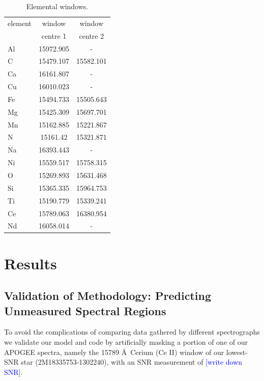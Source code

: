 \documentclass[a4paper,fleqn,usenatbib]{mnras}
\begin{document}
\begin{table}
    \centering
    \caption{Elemental windows.}
    \label{tab:window_centres}
    \begin{tabular}{lcc}
        \hline
        element & window & window \\
         & centre 1 & centre 2 \\
        \hline
        Al & 15972.905 & - \\
        C & 15479.107 & 15582.101 \\
        Ca & 16161.807 & - \\
        Cu & 16010.023 & - \\
        Fe & 15494.733 & 15505.643 \\
        Mg & 15425.309 & 15697.701 \\
        Mn & 15162.885 & 15221.867 \\
        N & 15161.42 & 15321.871 \\
        Na & 16393.443 & - \\
        Ni & 15559.517 & 15758.315 \\
        O & 15269.893 & 15631.468 \\
        Si & 15365.335 & 15964.753 \\
        Ti & 15190.779 & 15339.241 \\
        Ce & 15789.063 & 16380.954 \\
        Nd & 16058.014 & - \\
        \hline
    \end{tabular}
\end{table}


\section{Results}

\subsection{Validation of Methodology: Predicting Unmeasured Spectral Regions}

To avoid the complications of comparing data gathered by different spectrographs we validate our model and code by artificially masking a portion of one of our APOGEE spectra, namely the 15789 \AA\ Cerium (Ce II) window of our lowest-SNR star (2M18335753-1302240), with an SNR measurement of \textcolor{blue}{[write down SNR]}. 
\end{document}
